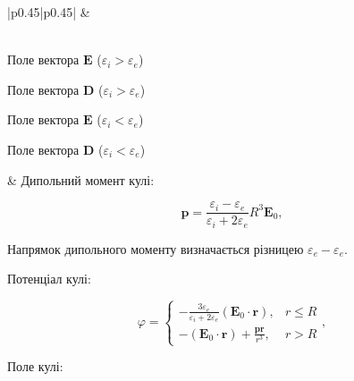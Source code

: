 \documentclass[12pt, oneside]{extarticle}
\newcommand{\vect}[1]{\symbf{#1}}
\newcommand{\vect}[1]{\mathbf{#1}}
\def\Efield{\vect{E}}
\def\Dfield{\vect{D}}
\let\phi\varphi
\let\epsilon\varepsilon}
\begin{document}
\begin{center}
	\begin{longtable}{|p{}|p{}|}
		\hline
		 &  \\
		\hline
		\endhead
		                                                                                                                                \\
		\hline

		\begin{center}
			Поле вектора $\Efield$ ($\epsilon_i > \epsilon_e$)

			

			Поле вектора $\Dfield$ ($\epsilon_i > \epsilon_e$)

			

			Поле вектора $\Efield$ ($\epsilon_i < \epsilon_e$)

			

			Поле вектора $\Dfield$ ($\epsilon_i < \epsilon_e$)

			

		\end{center}

		                                                                                                                   &
		Дипольний момент кулі:

		\[\vect{p} = \frac{\epsilon_i - \epsilon_e}{\epsilon_i + 2\epsilon_e}R^3\Efield_0,\]

		{\scriptsize Напрямок дипольного моменту визначається різницею $\epsilon_e - \epsilon_e$.}

		Потенціал кулі:

		\[
			\phi =
			\begin{cases}
				-\frac{3\epsilon_e}{\epsilon_i + 2\epsilon_e}\left( \Efield_0\cdot \vect{r}\right), & r \le R \\
				-\left( \Efield_0\cdot \vect{r}\right) + \frac{\vect{p} \vect{r}}{r^3},             & r > R
			\end{cases}
			,\]

		Поле кулі:


\end{longtable}
\end{center}
\end{document}
